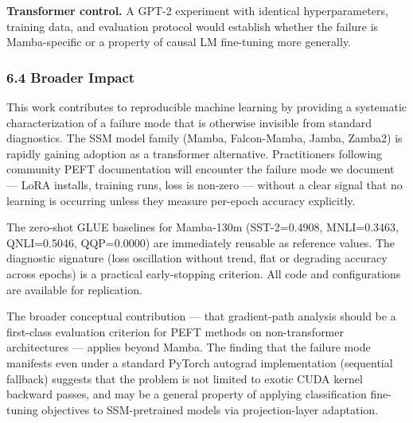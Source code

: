 \textbf{Transformer control.} A GPT-2 experiment with identical hyperparameters, training data, and evaluation protocol would establish whether the failure is Mamba-specific or a property of causal LM fine-tuning more generally.

\subsubsection{6.4 Broader Impact}

This work contributes to reproducible machine learning by providing a systematic characterization of a failure mode that is otherwise invisible from standard diagnostics. The SSM model family (Mamba, Falcon-Mamba, Jamba, Zamba2) is rapidly gaining adoption as a transformer alternative. Practitioners following community PEFT documentation will encounter the failure mode we document --- LoRA installs, training runs, loss is non-zero --- without a clear signal that no learning is occurring unless they measure per-epoch accuracy explicitly.

The zero-shot GLUE baselines for Mamba-130m (SST-2=0.4908, MNLI=0.3463, QNLI=0.5046, QQP=0.0000) are immediately reusable as reference values. The diagnostic signature (loss oscillation without trend, flat or degrading accuracy across epochs) is a practical early-stopping criterion. All code and configurations are available for replication.

The broader conceptual contribution --- that gradient-path analysis should be a first-class evaluation criterion for PEFT methods on non-transformer architectures --- applies beyond Mamba. The finding that the failure mode manifests even under a standard PyTorch autograd implementation (sequential fallback) suggests that the problem is not limited to exotic CUDA kernel backward passes, and may be a general property of applying classification fine-tuning objectives to SSM-pretrained models via projection-layer adaptation.

